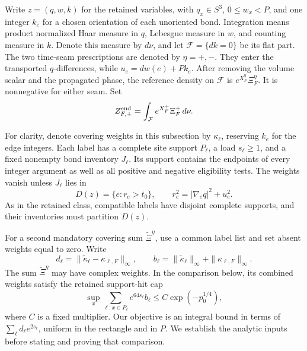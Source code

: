 Write \(z=(q,w,k)\) for the retained variables, with
\(q_x\in S^3\), \(0\le w_x<P\), and one integer \(k_e\) for a chosen
orientation of each unoriented bond.  Integration means product normalized
Haar measure in \(q\),
Lebesgue measure in \(w\), and counting measure in \(k\).  Denote this
measure by \(d\nu\), and let \(\mathcal F=\{dk=0\}\) be its flat part.
The two time-seam prescriptions are denoted by \(\eta=+,-\).  They enter
the transported \(q\)-differences, while
\(u_e=dw(e)+Pk_e\).  After removing the volume scalar and the propagated
phase, the reference density on \(\mathcal F\) is
\(e^{X_F^\eta}\Xi_F^\eta\).  It is nonnegative for either seam.  Set
\[
 Z_{F,+}^{\rm end}=\int_{\mathcal F}e^{X_F^+}\Xi_F^+\,d\nu.
\]

For clarity, denote covering weights in this subsection by
\(\kappa_\ell\), reserving \(k_e\) for the edge integers.  Each label has
a complete site support \(P_\ell\), a load \(s_\ell\ge1\), and a fixed
nonempty bond inventory \(J_\ell\).  Its support contains the endpoints
of every integer argument as well as all positive and negative eligibility
tests.  The weights vanish unless \(J_\ell\) lies in
\[
 D(z)=\{e:r_e>t_0\},\qquad
 r_e^2=|\nabla_e q|^2+u_e^2.
\]
As in the retained class, compatible labels have disjoint complete
supports, and their inventories must partition \(D(z)\).

For a second mandatory covering sum \(\widetilde\Xi^\eta\), use a common
label list and set absent weights equal to zero.  Write
\[
 d_\ell=\|\widetilde\kappa_\ell-\kappa_{\ell,F}\|_\infty,
 \qquad
 b_\ell=\|\widetilde\kappa_\ell\|_\infty+
              \|\kappa_{\ell,F}\|_\infty.
\]
The sum \(\widetilde\Xi^\eta\) may have complex weights.  In the comparison
below, its combined weights satisfy the retained support-hit cap
\[
 \sup_x\sum_{\ell:x\in P_\ell}e^{64s_\ell}b_\ell
 \le C\exp(-p_0^{1/4}),
\]
where \(C\) is a fixed multiplier.  Our objective is an integral bound in
terms of \(\sum_\ell d_\ell e^{2s_\ell}\), uniform in the rectangle and
in \(P\).  We establish the analytic inputs before stating and proving
that comparison.


